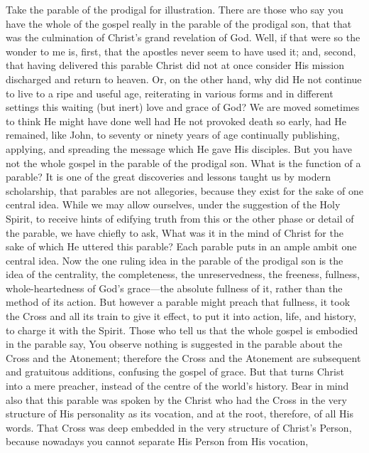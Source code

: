 \documentclass[12pt,letterpaper,oneside]{book}
\begin{document}
Take the parable of the prodigal for illustration. 
There are those who say you have the 
whole of the gospel really in the parable of the 
prodigal son, that that was the culmination of 
Christ's grand revelation of God. Well, if that 
were so the wonder to me is, first, that the 
apostles never seem to have used it; and, second, 
that having delivered this parable Christ did 
not at once consider His mission discharged and 
return to heaven. Or, on the other hand, why 
did He not continue to live to a ripe and useful 
age, reiterating in various forms and in different 
settings this waiting (but inert) love and grace 
of God? We are moved sometimes to think He 
might have done well had He not provoked 
death so early, had He remained, like John, to 
seventy or ninety years of age continually 
publishing, applying, and spreading the message 
which He gave His disciples. But you have not 
the whole gospel in the parable of the prodigal 
son. What is the function of a parable? It is 
one of the great discoveries and lessons taught 
us by modern scholarship, that parables are not 
allegories, because they exist for the sake of 
one central idea. While we may allow ourselves, 
under the suggestion of the Holy Spirit, 
to receive hints of edifying truth from this or 
the other phase or detail of the parable, we 
have chiefly to ask, What was it in the mind of 
Christ for the sake of which He uttered this 
parable? Each parable puts in an ample ambit 
one central idea. Now the one ruling idea in 
the parable of the prodigal son is the idea of 
the centrality, the completeness, the unreservedness, 
the freeness, fullness, whole-heartedness of 
God's grace---the absolute fullness of it, rather 
than the method of its action. But however a 
parable might preach that fullness, it took the 
Cross and all its train to give it effect, to put it 
into action, life, and history, to charge it with 
the Spirit. Those who tell us that the whole 
gospel is embodied in the parable say, You 
observe nothing is suggested in the parable 
about the Cross and the Atonement; therefore 
the Cross and the Atonement are subsequent 
and gratuitous additions, confusing the gospel 
of grace. But that turns Christ into a mere 
preacher, instead of the centre of the world's 
history. Bear in mind also that this parable was 
spoken by the Christ who had the Cross in the 
very structure of His personality as its vocation, 
and at the root, therefore, of all His words. 
That Cross was deep embedded in the very structure 
of Christ's Person, because nowadays you 
cannot separate His Person from His vocation, 
\end{document}
